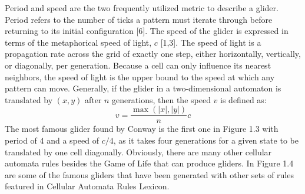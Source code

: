 \documentclass[12pt]{article}
\numberwithin{figure}{section} %
\begin{document}
Period and speed are the two frequently utilized metric to describe a glider. Period refers to the number of ticks a pattern must iterate through before returning to its initial configuration [6]. The speed of the glider is expressed in terms of the metaphorical speed of light, $c$ [1,3]. The speed of light is a propagation rate across the grid of exactly one step, either horizontally, vertically, or diagonally, per generation. Because a cell can only influence its nearest neighbors, the speed of light is the upper bound to the speed at which any pattern can move. Generally, if the glider in a two-dimensional automaton is translated by $(x,y)$ after $n$ generations, then the speed $v$ is defined as: 
$$v = \frac{\max(|x|, |y|)}{n}c$$
The most famous glider found by Conway is the first one in Figure 1.3 with period of 4 and a speed of $c/4$, as it takes four generations for a given state to be translated by one cell diagonally. Obviously, there are many other cellular automata rules besides the Game of Life that can produce gliders. In Figure 1.4 are some of the famous gliders that have been generated with other sets of rules featured in Cellular Automata Rules Lexicon. 
\end{document}
